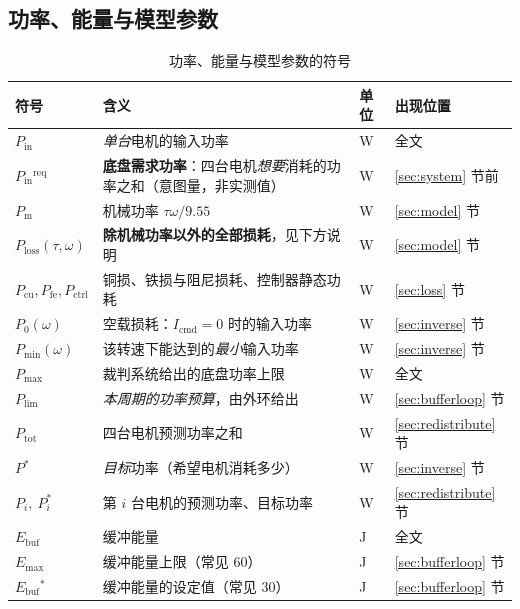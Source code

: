 \documentclass[cn,blue,11pt,device=normal]{elegantnote}
\newcommand{\Pin}{P_{\mathrm{in}}{}}
\newcommand{\Pmech}{P_{\mathrm{m}}{}}
\newcommand{\Icmd}{I_{\mathrm{cmd}}{}}
\newcommand{\Ebuf}{E_{\mathrm{buf}}{}}
\newcommand{\Plim}{P_{\mathrm{lim}}{}}
\newcommand{\Pmax}{P_{\max}{}}
\begin{document}
\subsection{功率、能量与模型参数}

\begin{table}[htbp]
  \centering
  \small
  \caption{功率、能量与模型参数的符号}
  \label{tab:sym-power}
  \begin{tabular}{@{}>{\raggedright\arraybackslash}p{}>{\raggedright\arraybackslash}p{}>{\raggedright\arraybackslash}p{}>{\raggedright\arraybackslash}p{}@{}}
    \toprule
    符号 & 含义 & 单位 & 出现位置 \\
    \midrule
    $\Pin$            & \emph{单台}电机的输入功率 & W & 全文 \\
    $\Pin^{\mathrm{req}}$ & \textbf{底盘需求功率}：四台电机\emph{想要}消耗的功率之和（意图量，非实测值） & W & \ref{sec:system} 节前 \\
    $\Pmech$          & 机械功率 $\tau\omega/9.55$ & W & \ref{sec:model} 节 \\
    $P_{\mathrm{loss}}(\tau,\omega)$ & \textbf{除机械功率以外的全部损耗}，见下方说明 & W & \ref{sec:model} 节 \\
    $P_{\mathrm{cu}},P_{\mathrm{fe}},P_{\mathrm{ctrl}}$ & 铜损、铁损与阻尼损耗、控制器静态功耗 & W & \ref{sec:loss} 节 \\
    $P_0(\omega)$     & 空载损耗：$\Icmd=0$ 时的输入功率 & W & \ref{sec:inverse} 节 \\
    $P_{\min}(\omega)$& 该转速下能达到的\emph{最小}输入功率 & W & \ref{sec:inverse} 节 \\
    $\Pmax$           & 裁判系统给出的底盘功率上限 & W & 全文 \\
    $\Plim$           & \emph{本周期的功率预算}，由外环给出 & W & \ref{sec:bufferloop} 节 \\
    $P_{\mathrm{tot}}$& 四台电机预测功率之和 & W & \ref{sec:redistribute} 节 \\
    $P^{\ast}$        & \emph{目标}功率（希望电机消耗多少） & W & \ref{sec:inverse} 节 \\
    $P_i,\ P_i^{\ast}$& 第 $i$ 台电机的预测功率、目标功率 & W & \ref{sec:redistribute} 节 \\
    $\Ebuf$           & 缓冲能量 & J & 全文 \\
    $E_{\max}$        & 缓冲能量上限（常见 $60$） & J & \ref{sec:bufferloop} 节 \\
    $\Ebuf^{\ast}$    & 缓冲能量的设定值（常见 $30$） & J & \ref{sec:bufferloop} 节 \\

\end{tabular}
\end{table}
\end{document}
